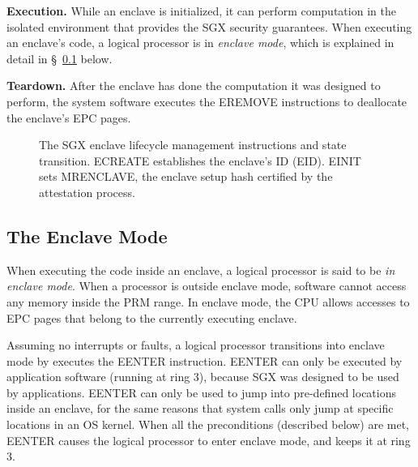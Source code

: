 \textbf{Execution.} While an enclave is initialized, it can perform computation
in the isolated environment that provides the SGX security guarantees. When
executing an enclave's code, a logical processor is in \textit{enclave mode},
which is explained in detail in \S~\ref{sec:enclave_mode} below.

\textbf{Teardown.} After the enclave has done the computation it was designed
to perform, the system software executes the EREMOVE instructions to deallocate
the enclave's EPC pages.

\begin{figure}[hbt]
  \caption{
    The SGX enclave lifecycle management instructions and state transition.
    ECREATE establishes the enclave's ID (EID). EINIT sets MRENCLAVE, the
    enclave setup hash certified by the attestation process.
  }
  \label{fig:enclave_lifecycle}
\end{figure}


\subsection{The Enclave Mode}
\label{sec:enclave_mode}


When executing the code inside an enclave, a logical processor is said to be
\textit{in enclave mode}. When a processor is outside enclave mode, software
cannot access any memory inside the PRM range. In enclave mode, the CPU allows
accesses to EPC pages that belong to the currently executing enclave.

Assuming no interrupts or faults, a logical processor transitions into enclave
mode by executes the EENTER instruction. EENTER can only be executed by
application software (running at ring 3), because SGX was designed to be used
by applications. EENTER can only be used to jump into pre-defined locations
inside an enclave, for the same reasons that system calls only jump at specific
locations in an OS kernel. When all the preconditions (described below) are
met, EENTER causes the logical processor to enter enclave mode, and keeps it at
ring 3.

